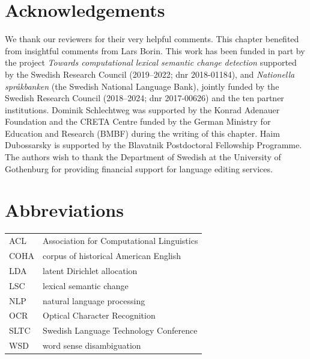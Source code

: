 \documentclass[output=paper]{langscibook}
\begin{document}
\section*{Acknowledgements}
We thank our reviewers for their very helpful comments.
This chapter benefited from insightful comments from Lars Borin.
This work has been funded in part by the project \textit{Towards computational lexical semantic change detection} supported by the Swedish Research Council (2019--2022; dnr 2018-01184), and \emph{Nationella språkbanken} (the Swedish National Language Bank), jointly funded  by  the Swedish Research Council (2018--2024; dnr 2017-00626) and the ten partner institutions.
Dominik Schlechtweg was supported by the Konrad Adenauer Foundation and the CRETA Centre funded by the German Ministry for Education and Research (BMBF) during the writing of this chapter.
Haim Dubossarsky is supported by the Blavatnik Postdoctoral Fellowship Programme.
The authors wish to thank the Department of Swedish at the University of Gothenburg for providing financial support for language editing services.

\section*{Abbreviations}
\begin{tabularx}{\textwidth}{@{}lQ@{}}
ACL & Association for Computational Linguistics \\
COHA & corpus of historical American English \\
LDA & latent Dirichlet allocation\\
LSC & lexical semantic change\\
NLP & natural language processing \\
OCR & Optical Character Recognition\\
SLTC & Swedish Language Technology Conference\\
WSD & word sense disambiguation \\
\end{tabularx}

{\sloppy\printbibliography[heading=subbibliography,notkeyword=this]}
\end{document}
